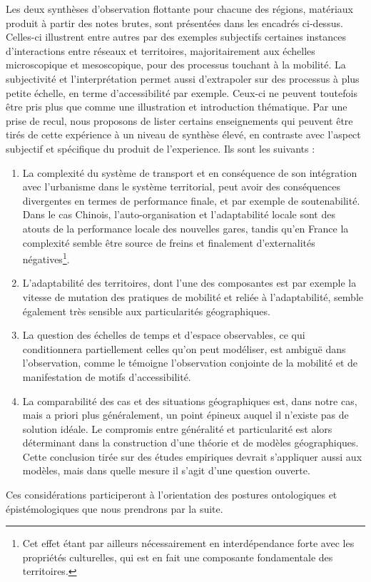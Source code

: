 Les deux synthèses d'observation flottante pour chacune des régions, matériaux produit à partir des notes brutes, sont présentées dans les encadrés ci-dessus. Celles-ci illustrent entre autres par des exemples subjectifs certaines instances d'interactions entre réseaux et territoires, majoritairement aux échelles microscopique et mesoscopique, pour des processus touchant à la mobilité. La subjectivité et l'interprétation permet aussi d'extrapoler sur des processus à plus petite échelle, en terme d'accessibilité par exemple. Ceux-ci ne peuvent toutefois être pris plus que comme une illustration et introduction thématique. Par une prise de recul, nous proposons de lister certains enseignements qui peuvent être tirés de cette expérience à un niveau de synthèse élevé, en contraste avec l'aspect subjectif et spécifique du produit de l'experience. Ils sont les suivants :

\begin{enumerate}
	\item La complexité du système de transport et en conséquence de son intégration avec l'urbanisme dans le système territorial, peut avoir des conséquences divergentes en termes de performance finale, et par exemple de soutenabilité. Dans le cas Chinois, l'auto-organisation et l'adaptabilité locale sont des atouts de la performance locale des nouvelles gares, tandis qu'en France la complexité semble être source de freins et finalement d'externalités négatives\footnote{Cet effet étant par ailleurs nécessairement en interdépendance forte avec les propriétés culturelles, qui est en fait une composante fondamentale des territoires.}.
	\item L'adaptabilité des territoires, dont l'une des composantes est par exemple la vitesse de mutation des pratiques de mobilité et reliée à l'adaptabilité, semble également très sensible aux particularités géographiques.
	\item La question des échelles de temps et d'espace observables, ce qui conditionnera partiellement celles qu'on peut modéliser, est ambiguë dans l'observation, comme le témoigne l'observation conjointe de la mobilité et de manifestation de motifs d'accessibilité.
	\item La comparabilité des cas et des situations géographiques est, dans notre cas, mais a priori plus généralement, un point épineux auquel il n'existe pas de solution idéale. Le compromis entre généralité et particularité est alors déterminant dans la construction d'une théorie et de modèles géographiques. Cette conclusion tirée sur des études empiriques devrait s'appliquer aussi aux modèles, mais dans quelle mesure il s'agit d'une question ouverte.
\end{enumerate}


Ces considérations participeront à l'orientation des postures ontologiques et épistémologiques que nous prendrons par la suite.



\stars




